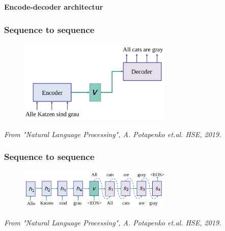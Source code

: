 \documentclass{tum-presentation}
\begin{document}
\begin{frame}[c]
	\centering
	\begin{center}
		\Huge\textbf{Encode-decoder architectur}
	\end{center}
\end{frame}

\begin{frame}
  \frametitle{Sequence to sequence}
	\begin{figure}
		\centering
		\includegraphics[width=0.65\textwidth,keepaspectratio=true]{tum-resources/images/seq2seq_1.png}
		\label{fig:seq2seq_1}
	\end{figure}
	\begin{flushright}
		\textit{	From "Natural Language Processing", A. Potapenko et.al. HSE, 2019. }
	\end{flushright}
\end{frame}

\begin{frame}
	\frametitle{Sequence to sequence}
	\begin{figure}
		\centering
		\includegraphics[width=0.65\textwidth,keepaspectratio=true]{tum-resources/images/seq2seq_2.png}
		\label{fig:seq2seq_2}
	\end{figure}
	\begin{flushright}
		\textit{	From "Natural Language Processing", A. Potapenko et.al. HSE, 2019. }
	\end{flushright}
\end{frame}
\end{document}
